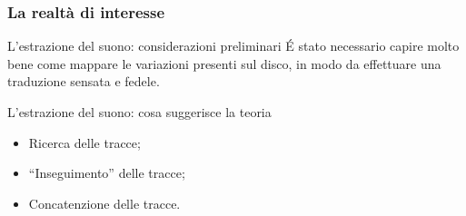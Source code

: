 \begin{frame}
\frametitle{La realtà di interesse}
\begin{block}{L'estrazione del suono: considerazioni preliminari}
\'E stato necessario capire molto bene come mappare le variazioni presenti
sul disco, in modo da effettuare una traduzione sensata e fedele.
\end{block}
\begin{block}{L'estrazione del suono: cosa suggerisce la teoria}
\begin{itemize}
\item Ricerca delle tracce;
\item ``Inseguimento'' delle tracce;
\item Concatenzione delle tracce.
\end{itemize}
\end{block}
\end{frame}
